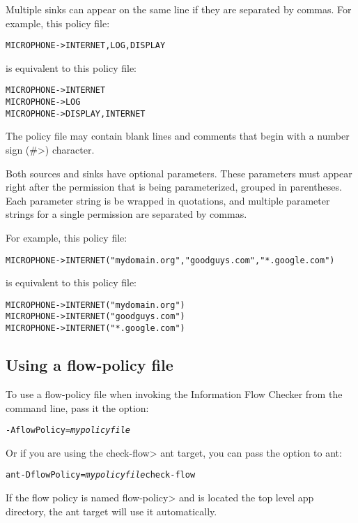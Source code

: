 Multiple sinks can appear on the same line if they are separated by commas. 
For example, this policy file:
\begin{alltt}
   MICROPHONE -> INTERNET, LOG, DISPLAY
\end{alltt}
is equivalent to this policy file:
\begin{alltt}
   MICROPHONE -> INTERNET
   MICROPHONE -> LOG
   MICROPHONE -> DISPLAY, INTERNET
\end{alltt}

The policy file may contain blank lines and comments that begin with 
a number sign (\<\#>) character. \newline

\noindent
Both sources and sinks have optional parameters. These parameters must appear
right after the permission that is being parameterized, grouped in parentheses. 
Each parameter string is be wrapped in quotations, and multiple parameter
strings for a single permission are separated by commas.\newline

\noindent
For example, this policy file:
\begin{alltt}
   MICROPHONE -> INTERNET("mydomain.org", "goodguys.com", "*.google.com")
\end{alltt}
is equivalent to this policy file:
\begin{alltt}
   MICROPHONE -> INTERNET("mydomain.org")
   MICROPHONE -> INTERNET("goodguys.com")
   MICROPHONE -> INTERNET("*.google.com")
\end{alltt}


\subsection{Using a flow-policy file}
To use a flow-policy file when invoking the Information Flow Checker from the
command line, pass it the option:
\begin{alltt}
-AflowPolicy=\emph{mypolicyfile}
\end{alltt}

Or if you are using the \<check-flow> ant target, you can pass the option to ant:
\begin{alltt}
ant -DflowPolicy=\emph{mypolicyfile} check-flow
\end{alltt}
If the flow policy is named \<flow-policy> and is located the top level app directory, the ant 
target will use it automatically.



